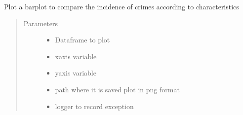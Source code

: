 \documentclass[letterpaper,10pt,english]{sphinxmanual}
\begin{document}
\begin{fulllineitems}
\label{\detokenize{index:dummy_project_utils.plot_barplot}}
\sphinxAtStartPar
{}

\sphinxAtStartPar
Plot a barplot to compare the incidence of crimes according to characteristics
\begin{quote}\begin{description}
\item[{Parameters}] \leavevmode\begin{itemize}
\item {} 
\sphinxAtStartPar
{} \textendash{} Dataframe to plot

\item {} 
\sphinxAtStartPar
{} \textendash{} x\sphinxhyphen{}axis variable

\item {} 
\sphinxAtStartPar
{} \textendash{} y\sphinxhyphen{}axis variable

\item {} 
\sphinxAtStartPar
{} \textendash{} path where it is saved plot in png format

\item {} 
\sphinxAtStartPar
{} \textendash{} logger to record exception

\end{itemize}

\end{description}\end{quote}

\end{fulllineitems}

\end{document}
